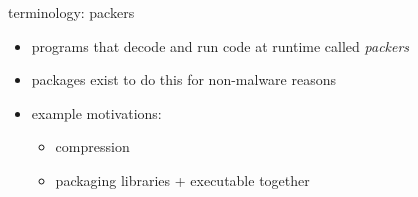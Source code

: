 \begin{frame}{terminology: packers}
    \begin{itemize}
    \item programs that decode and run code at runtime called \textit{packers}
    \item packages exist to do this for non-malware reasons
    \item example motivations:
        \begin{itemize}
        \item compression
        \item packaging libraries + executable together
        \end{itemize}
    \end{itemize}
\end{frame}
